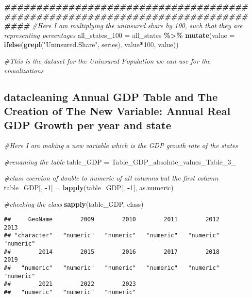 \documentclass[
]{article}
\newenvironment{Shaded}{\begin{snugshade}}{\end{snugshade}}
\newcommand{\AttributeTok}[1]{\textcolor[rgb]{0.13,0.29,0.53}{#1}}
\newcommand{\CommentTok}[1]{\textcolor[rgb]{0.56,0.35,0.01}{\textit{#1}}}
\newcommand{\DecValTok}[1]{\textcolor[rgb]{0.00,0.00,0.81}{#1}}
\newcommand{\DocumentationTok}[1]{\textcolor[rgb]{0.56,0.35,0.01}{\textbf{\textit{#1}}}}
\newcommand{\FunctionTok}[1]{\textcolor[rgb]{0.13,0.29,0.53}{\textbf{#1}}}
\newcommand{\NormalTok}[1]{#1}
\newcommand{\OtherTok}[1]{\textcolor[rgb]{0.56,0.35,0.01}{#1}}
\newcommand{\SpecialCharTok}[1]{\textcolor[rgb]{0.81,0.36,0.00}{\textbf{#1}}}
\newcommand{\StringTok}[1]{\textcolor[rgb]{0.31,0.60,0.02}{#1}}
\begin{document}
\begin{Shaded}
\begin{Highlighting}[]
\DocumentationTok{\#\#\#\#\#\#\#\#\#\#\#\#\#\#\#\#\#\#\#\#\#\#\#\#\#\#\#\#\#\#\#\#\#\#\#\#\#\#\#\#\#\#\#\#\#\#\#\#\#\#\#\#\#\#\#\#\#\#\#\#\#\#\#\#\#\#\#\#\#\#\#\#\#\#\#\#\#\#\#\#}
\CommentTok{\#Here I am multiplying the uninsured share by 100, such that they are representing percentages}
\NormalTok{all\_states\_100 }\OtherTok{=}\NormalTok{ all\_states }\SpecialCharTok{\%\textgreater{}\%}
  \FunctionTok{mutate}\NormalTok{(}\AttributeTok{value =} 
           \FunctionTok{ifelse}\NormalTok{(}\FunctionTok{grepl}\NormalTok{(}\StringTok{"Uninsured.Share"}\NormalTok{,}
\NormalTok{                        series), value}\SpecialCharTok{*}\DecValTok{100}\NormalTok{, value))}

\CommentTok{\#This is the dataset for the Uninsured Population we can use for the visualizations}
\end{Highlighting}
\end{Shaded}

\subsection{datacleaning Annual GDP Table and The Creation of The New
Variable: Annual Real GDP Growth per year and
state}\label{datacleaning-annual-gdp-table-and-the-creation-of-the-new-variable-annual-real-gdp-growth-per-year-and-state}

\begin{Shaded}
\begin{Highlighting}[]
\CommentTok{\#Here I am making a new variable which is the GDP growth rate of the states}

\CommentTok{\#renaming the table}
\NormalTok{table\_GDP }\OtherTok{=}\NormalTok{ Table\_GDP\_absolute\_values\_Table\_3\_}

\CommentTok{\#class coercion of double to numeric of all columns but the first column}
\NormalTok{table\_GDP[, }\SpecialCharTok{{-}}\DecValTok{1}\NormalTok{] }\OtherTok{=} \FunctionTok{lapply}\NormalTok{(table\_GDP[, }\SpecialCharTok{{-}}\DecValTok{1}\NormalTok{], as.numeric)}

\CommentTok{\#checking the class}
\FunctionTok{sapply}\NormalTok{(table\_GDP, class)}
\end{Highlighting}
\end{Shaded}

\begin{verbatim}
##     GeoName        2009        2010        2011        2012        2013 
## "character"   "numeric"   "numeric"   "numeric"   "numeric"   "numeric" 
##        2014        2015        2016        2017        2018        2019 
##   "numeric"   "numeric"   "numeric"   "numeric"   "numeric"   "numeric" 
##        2021        2022        2023 
##   "numeric"   "numeric"   "numeric"
\end{verbatim}
\end{document}
